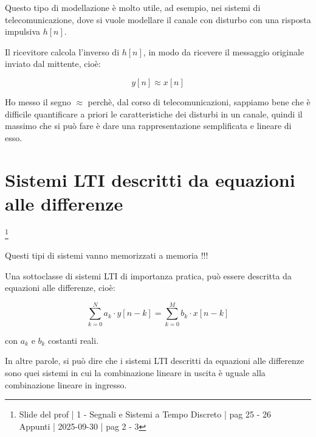 \begin{tcolorbox}
    Questo tipo di modellazione è molto utile, ad esempio, nei sistemi di telecomunicazione, 
    dove si vuole modellare il canale con disturbo con una risposta impulsiva $h \left[n\right]$. \newline 

    Il ricevitore calcola l'inverso di $h \left[ n\right]$, in modo da ricevere il messaggio originale inviato dal mittente, 
    cioè: 

    {
        \Large 
        \begin{equation}
            y \left[ n \right] \approx x \left[ n\right]
        \end{equation}
    }

    Ho messo il segno $\approx$ perchè, dal corso di telecomunicazioni, sappiamo bene che è difficile quantificare a priori le caratteristiche dei disturbi in un canale, 
    quindi il massimo che si può fare è dare una rappresentazione semplificata e lineare di esso. 
\end{tcolorbox}

\newpage 

\section{Sistemi LTI descritti da equazioni alle differenze} \label{sec: Sistemi LTI descritti da equazioni alle differenze}

\footnote{ 
    Slide del prof | 1 - Segnali e Sistemi a Tempo Discreto | pag 25 - 26\\
    Appunti | 2025-09-30 | pag 2 - 3
}
\begin{tcolorbox}
Questi tipi di sistemi vanno memorizzati a memoria !!!    
\end{tcolorbox}

Una sottoclasse di sistemi LTI di importanza pratica, 
può essere descritta da equazioni alle differenze, cioè: 

{
    \Large 
    \begin{equation}
        \sum_{k = 0}^{N}
        a_k \cdot y [n - k]
        =
        \sum_{k = 0}^{M}
        b_k \cdot x [n - k] 
    \end{equation}
} 

con $a_k$ e $b_k$ costanti reali. \newline 

In altre parole, si può dire che i sistemi LTI descritti da equazioni alle differenze 
sono quei sistemi in cui la combinazione lineare in uscita è uguale alla combinazione lineare in ingresso. \newline 

